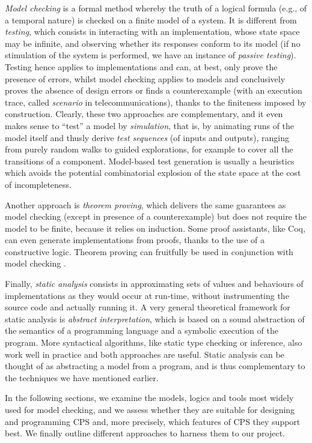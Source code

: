 \documentclass[a4paper,11pt,twoside]{article}
\begin{document}
\emph{Model checking} is a formal method whereby the truth of a
logical formula (e.g., of a temporal nature) is checked on a finite
model of a system. It is different from \emph{testing}, which consists
in interacting with an implementation, whose state space may be
infinite, and observing whether its responses conform to its model (if
no stimulation of the system is performed, we have an instance of
\emph{passive testing}). Testing hence applies to implementations and
can, at best, only prove the presence of errors, whilst model checking
applies to models and conclusively proves the absence of design errors
or finds a counterexample (with an execution trace, called
\emph{scenario} in telecommunications), thanks to the finiteness
imposed by construction. Clearly, these two approaches are
complementary, and it even makes sense to ``test'' a model by
\emph{simulation}, that is, by animating runs of the model itself and
thusly derive \emph{test sequences} (of inputs and outputs), ranging
from purely random walks to guided explorations, for example to cover
all the transitions of a component. Model\hyp{}based test generation
is usually a heuristics which avoids the potential combinatorial
explosion of the state space at the cost of incompleteness.

Another approach is \emph{theorem proving}, which delivers the same
guarantees as model checking (except in presence of a counterexample)
but does not require the model to be finite, because it relies on
induction. Some proof assistants, like \textsf{Coq}, can even generate
implementations from proofs, thanks to the use of a constructive
logic. Theorem proving can fruitfully be used in conjunction with
model checking \citep{vanGasterLensingSmetsersvanEekelen:2011}.

Finally, \emph{static analysis} consists in approximating sets of
values and behaviours of implementations as they would occur at
run-time, without instrumenting the source code and actually running
it. A very general theoretical framework for static analysis is
\emph{abstract interpretation}, which is based on a sound abstraction
of the semantics of a programming language and a symbolic execution of
the program. More syntactical algorithms, like static type checking or
inference, also work well in practice and both approaches are
useful. Static analysis can be thought of as abstracting a model from
a program, and is thus complementary to the techniques we have
mentioned earlier.

In the following sections, we examine the models, logics and tools
most widely used for model checking, and we assess whether they are
suitable for designing and programming CPS and, more precisely, which
features of CPS they support best. We finally outline different
approaches to harness them to our project.
\end{document}

